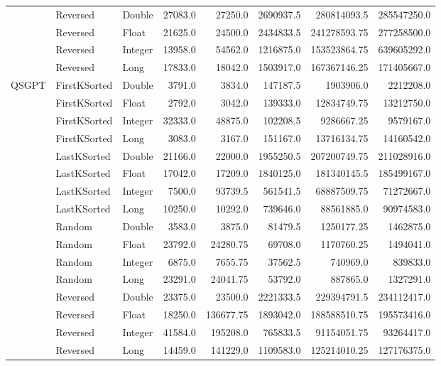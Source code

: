 \documentclass[unicode,11pt,a4paper,oneside,numbers=endperiod,openany]{scrartcl}
\begin{document}
\begin{center}
\begin{longtable}{|l|l|l|r|r|r|r|r|}
            & Reversed & Double & 27083.0 & 27250.0 & 2690937.5 & 280814093.5 & 285547250.0 \\
            & Reversed & Float & 21625.0 & 24500.0 & 2434833.5 & 241278593.75 & 277258500.0 \\
            & Reversed & Integer & 13958.0 & 54562.0 & 1216875.0 & 153523864.75 & 639605292.0 \\
            & Reversed & Long & 17833.0 & 18042.0 & 1503917.0 & 167367146.25 & 171405667.0 \\
            \hline
            \multirow{16}{*}{QSGPT} & FirstKSorted & Double & 3791.0 & 3834.0 & 147187.5 & 1903906.0 & 2212208.0 \\
            & FirstKSorted & Float & 2792.0 & 3042.0 & 139333.0 & 12834749.75 & 13212750.0 \\
            & FirstKSorted & Integer & 32333.0 & 48875.0 & 102208.5 & 9286667.25 & 9579167.0 \\
            & FirstKSorted & Long & 3083.0 & 3167.0 & 151167.0 & 13716134.75 & 14160542.0 \\
            & LastKSorted & Double & 21166.0 & 22000.0 & 1955250.5 & 207200749.75 & 211028916.0 \\
            & LastKSorted & Float & 17042.0 & 17209.0 & 1840125.0 & 181340145.5 & 185499167.0 \\
            & LastKSorted & Integer & 7500.0 & 93739.5 & 561541.5 & 68887509.75 & 71272667.0 \\
            & LastKSorted & Long & 10250.0 & 10292.0 & 739646.0 & 88561885.0 & 90974583.0 \\
            & Random & Double & 3583.0 & 3875.0 & 81479.5 & 1250177.25 & 1462875.0 \\
            & Random & Float & 23792.0 & 24280.75 & 69708.0 & 1170760.25 & 1494041.0 \\
            & Random & Integer & 6875.0 & 7655.75 & 37562.5 & 740969.0 & 839833.0 \\
            & Random & Long & 23291.0 & 24041.75 & 53792.0 & 887865.0 & 1327291.0 \\
            & Reversed & Double & 23375.0 & 23500.0 & 2221333.5 & 229394791.5 & 234112417.0 \\
            & Reversed & Float & 18250.0 & 136677.75 & 1893042.0 & 188588510.75 & 195573416.0 \\
            & Reversed & Integer & 41584.0 & 195208.0 & 765833.5 & 91154051.75 & 93264417.0 \\
            & Reversed & Long & 14459.0 & 141229.0 & 1109583.0 & 125214010.25 & 127176375.0 \\

\end{longtable}
\end{center}
\end{document}
